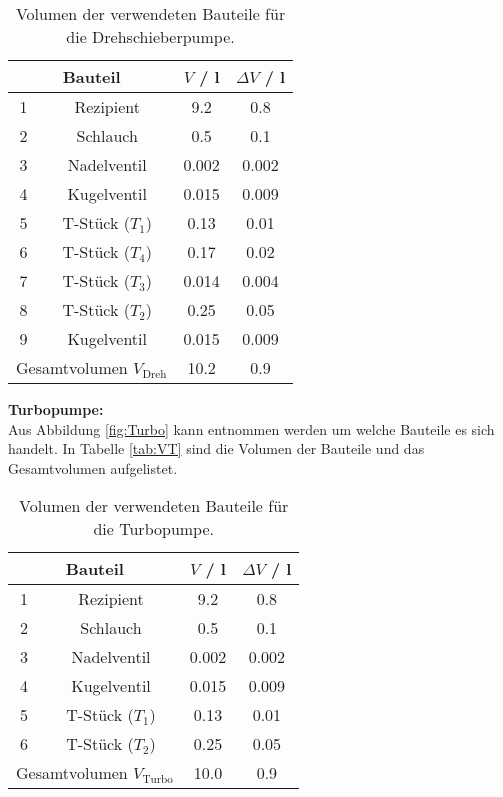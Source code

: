 \begin{table}[H] %
  \centering
  \caption{Volumen der verwendeten Bauteile für die Drehschieberpumpe.}
  \label{tab:VD}
  \begin{tabular}{c|c|c|c}
    \multicolumn{2}{c|}{Bauteil} & $V$ / l & $\Delta V$ / l \\
    \midrule
    1 & Rezipient & 9.2 & 0.8 \\
    2 & Schlauch & 0.5 & 0.1 \\
    3 & Nadelventil & 0.002 & 0.002 \\
    4 & Kugelventil & 0.015 & 0.009 \\
    5 & T-Stück ($T_1$) & 0.13 & 0.01 \\
    6 & T-Stück ($T_4$) & 0.17 & 0.02 \\
    7 & T-Stück ($T_3$) & 0.014 & 0.004 \\
    8 & T-Stück ($T_2$) & 0.25 & 0.05 \\
    9 & Kugelventil & 0.015 & 0.009 \\
    \midrule
    \multicolumn{2}{c|}{Gesamtvolumen $V_\text{Dreh}$} & 10.2 & 0.9 \\
  \end{tabular}
\end{table}

\textbf{Turbopumpe:} \\
Aus Abbildung \eqref{fig:Turbo} kann entnommen werden um welche Bauteile es sich handelt. In Tabelle \eqref{tab:VT} sind die Volumen der Bauteile und das Gesamtvolumen aufgelistet.

\begin{table}[H] %
  \centering
  \caption{Volumen der verwendeten Bauteile für die Turbopumpe.}
  \label{tab:VT}
  \begin{tabular}{c|c|c|c}
    \multicolumn{2}{c|}{Bauteil} & $V$ / l & $\Delta V$ / l \\
    \midrule
    1 & Rezipient & 9.2 & 0.8 \\
    2 & Schlauch & 0.5 & 0.1 \\
    3 & Nadelventil & 0.002 & 0.002 \\
    4 & Kugelventil & 0.015 & 0.009 \\
    5 & T-Stück ($T_1$) & 0.13 & 0.01 \\
    6 & T-Stück ($T_2$) & 0.25 & 0.05 \\
    \midrule
    \multicolumn{2}{c|}{Gesamtvolumen $V_\text{Turbo}$} & 10.0 & 0.9 \\
  \end{tabular}
\end{table}



